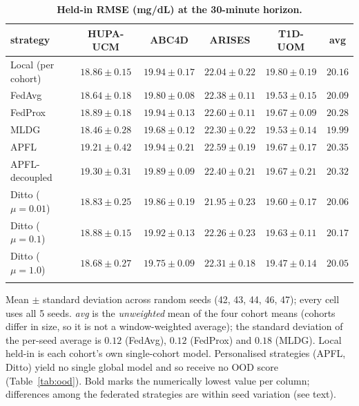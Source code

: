\documentclass[10pt,letterpaper]{article}
\newlength\savedwidth
\newcommand\thickhline{\noalign{\global\savedwidth\arrayrulewidth\global\arrayrulewidth 2pt}%
\hline
\noalign{\global\arrayrulewidth\savedwidth}}
\begin{document}
\begin{table}[!ht]
\centering
\captionsetup{justification=centering,singlelinecheck=on}
\caption{\bf Held-in RMSE (mg/dL) at the 30-minute horizon.}
\label{tab:main}
\begin{tabular}{lccccc}
\thickhline
strategy & HUPA-UCM & ABC4D & ARISES & T1D-UOM & avg \\
\hline
Local (per cohort) & $18.86 \pm 0.15$ & $19.94 \pm 0.17$ & $22.04 \pm 0.22$ & $19.80 \pm 0.19$ & $20.16$ \\
\hline
FedAvg  & $18.64 \pm 0.18$ & $19.80 \pm 0.08$ & $22.38 \pm 0.11$ & $19.53 \pm 0.15$ & $20.09$ \\
FedProx & $18.89 \pm 0.18$ & $19.94 \pm 0.13$ & $22.60 \pm 0.11$ & $19.67 \pm 0.09$ & $20.28$ \\
MLDG    & $\mathbf{18.46 \pm 0.28}$ & $\mathbf{19.68 \pm 0.12}$ & $22.30 \pm 0.22$ & $19.53 \pm 0.14$ & $\mathbf{19.99}$ \\
\hline
APFL           & $19.21 \pm 0.42$ & $19.94 \pm 0.21$ & $22.59 \pm 0.19$ & $19.67 \pm 0.17$ & $20.35$ \\
APFL-decoupled & $19.30 \pm 0.31$ & $19.89 \pm 0.09$ & $22.40 \pm 0.21$ & $19.67 \pm 0.21$ & $20.32$ \\
Ditto ($\mu{=}0.01$) & $18.83 \pm 0.25$ & $19.86 \pm 0.19$ & $\mathbf{21.95 \pm 0.23}$ & $19.60 \pm 0.17$ & $20.06$ \\
Ditto ($\mu{=}0.1$)  & $18.88 \pm 0.15$ & $19.92 \pm 0.13$ & $22.26 \pm 0.23$ & $19.63 \pm 0.11$ & $20.17$ \\
Ditto ($\mu{=}1.0$)  & $18.68 \pm 0.27$ & $19.75 \pm 0.09$ & $22.31 \pm 0.18$ & $\mathbf{19.47 \pm 0.14}$ & $20.05$ \\
\thickhline
\end{tabular}
\begin{center}
{\small Mean $\pm$ standard deviation across random seeds (42, 43, 44, 46, 47);
every cell uses all 5 seeds.
\emph{avg} is the \emph{unweighted} mean of the four cohort means (cohorts differ
in size, so it is not a window-weighted average); the standard deviation of the
per-seed average is $0.12$ (FedAvg), $0.12$ (FedProx) and $0.18$ (MLDG). Local
held-in is each cohort's own single-cohort model. Personalised strategies (APFL,
Ditto) yield no single global model and so receive no OOD score
(Table~\ref{tab:ood}). Bold marks the numerically lowest value per column;
differences among the federated strategies are within seed variation (see text).}
\end{center}
\end{table}
\end{document}
